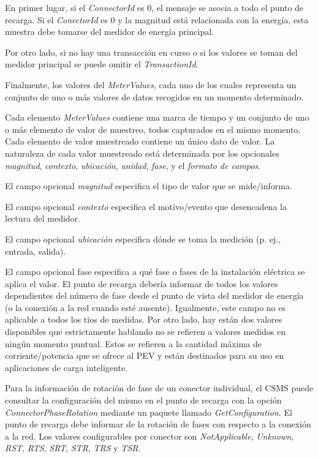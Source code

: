 \documentclass[12pt,a4paper,onecolumn,oneside]{report}
\begin{document}
En primer lugar, si el \textit{ConnectorId} es 0, el mensaje se asocia a todo el punto de recarga. Si el \textit{ConectorId} es 0 y la magnitud está relacionada con la energía, esta muestra debe tomarse del medidor de energía principal.

Por otro lado, si no hay una transacción en curso o si los valores se toman del medidor principal se puede omitir el \textit{TransactionId}. 

Finalmente, los valores del \textit{MeterValues}, cada uno de los cuales representa un conjunto de uno o más valores de datos recogidos en un momento determinado.

Cada elemento \textit{MeterValues} contiene una marca de tiempo y un conjunto de uno o más elemento de valor de muestreo, todos capturados en el mismo momento. Cada elemento de valor muestreado contiene un único dato de valor. La naturaleza de cada valor muestreado está determinada por los opcionales \textit{magnitud}, \textit{contexto}, \textit{ubicación}, \textit{unidad}, \textit{fase}, y el \textit{formato de campos}.

El campo opcional \textit{magnitud} especifica el tipo de valor que se mide/informa.

El campo opcional \textit{contexto} especifica el motivo/evento que desencadena la lectura del medidor.

El campo opcional \textit{ubicación} especifica dónde se toma la medición (p. ej., entrada, salida).

El campo opcional fase especifica a qué fase o fases de la instalación eléctrica se aplica el valor. El punto de recarga debería informar de todos los valores dependientes del número de fase desde el punto de vista del medidor de energía (o la conexión a la red cuando esté ausente). Igualmente, este campo no es aplicable a todos los tios de medidas. Por otro lado, hay están dos valores disponibles que estrictamente hablando no se refieren a valores medidos en ningún momento puntual. Estos se refieren a la cantidad máxima de corriente/potencia que se ofrece al PEV y están destinados para su uso en aplicaciones de carga inteligente.

Para la información de rotación de fase de un conector individual, el CSMS puede consultar la configuración del mismo en el punto de recarga con la opción \textit{ConnectorPhaseRotation} mediante un paquete llamado \textit{GetConfiguration}. El punto de recarga debe informar de la rotación de fases con respecto a la conexión a la red. Los valores configurables por conector son \textit{NotApplicable}, \textit{Unknown}, \textit{RST}, \textit{RTS}, \textit{SRT}, \textit{STR}, \textit{TRS} y \textit{TSR}. 
\end{document}
